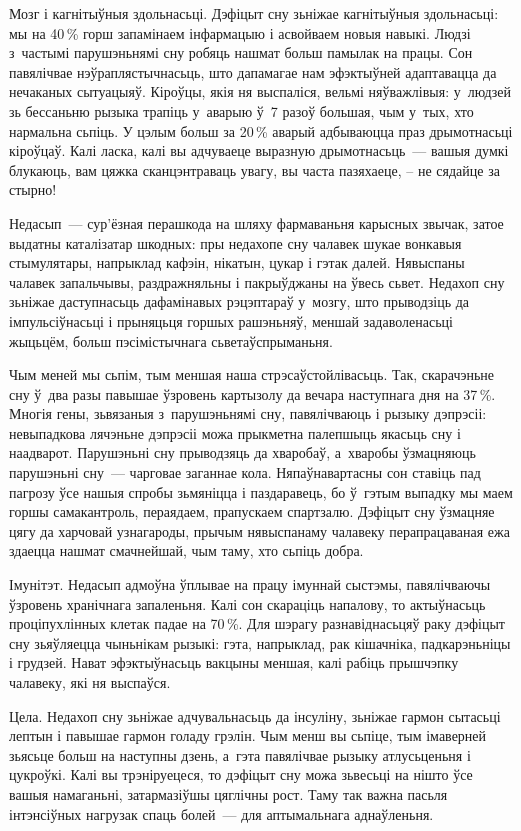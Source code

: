 Мозг і кагнітыўныя здольнасьці. Дэфіцыт сну зьніжае кагнітыўныя здольнасьці: мы на 40\,\% горш запамінаем інфармацыю і асвойваем новыя навыкі. Людзі з~частымі парушэньнямі сну робяць нашмат больш памылак на працы. Сон павялічвае нэўраплястычнасьць, што дапамагае нам эфэктыўней адаптавацца да нечаканых сытуацыяў. Кіроўцы, якія ня выспаліся, вельмі няўважлівыя: у~людзей зь бессаньню рызыка трапіць у~аварыю ў~7 разоў большая, чым у~тых, хто нармальна сьпіць. У цэлым больш за 20\,\% аварый адбываюцца праз дрымотнасьці кіроўцаў. Калі ласка, калі вы адчуваеце выразную дрымотнасьць~--- вашыя думкі блукаюць, вам цяжка сканцэнтраваць увагу, вы часта пазяхаеце, -- не сядайце за стырно!

Недасып~--- сур'ёзная перашкода на шляху фармаваньня карысных звычак, затое выдатны каталізатар шкодных: пры недахопе сну чалавек шукае вонкавыя стымулятары, напрыклад кафэін, нікатын, цукар і гэтак далей. Нявыспаны чалавек запальчывы, раздражняльны і пакрыўджаны на ўвесь сьвет. Недахоп сну зьніжае даступнасьць дафамінавых рэцэптараў у~мозгу, што прыводзіць да імпульсіўнасьці і прыняцьця горшых рашэньняў, меншай задаволенасьці жыцьцём, больш пэсімістычнага сьветаўспрыманьня.

Чым меней мы сьпім, тым меншая наша стрэсаўстойлівасьць. Так, скарачэньне сну ў~два разы павышае ўзровень картызолу да вечара наступнага дня на 37\,\%. Многія гены, зьвязаныя з~парушэньнямі сну, павялічваюць і рызыку дэпрэсіі: невыпадкова лячэньне дэпрэсіі можа прыкметна палепшыць якасьць сну і наадварот. Парушэньні сну прыводзяць да хваробаў, а~хваробы ўзмацняюць парушэньні сну~--- чарговае заганнае кола. Няпаўнавартасны сон ставіць пад пагрозу ўсе нашыя спробы зьмяніцца і паздаравець, бо ў~гэтым выпадку мы маем горшы самакантроль, пераядаем, прапускаем спартзалю. Дэфіцыт сну ўзмацняе цягу да харчовай узнагароды, прычым нявыспанаму чалавеку перапрацаваная ежа здаецца нашмат смачнейшай, чым таму, хто сьпіць добра.

Імунітэт. Недасып адмоўна ўплывае на працу імуннай сыстэмы, павялічваючы ўзровень хранічнага запаленьня. Калі сон скараціць напалову, то актыўнасьць проціпухлінных клетак падае на 70\,\%. Для шэрагу разнавіднасьцяў раку дэфіцыт сну зьяўляецца чыньнікам рызыкі: гэта, напрыклад, рак кішачніка, падкарэньніцы і грудзей. Нават эфэктыўнасьць вакцыны меншая, калі рабіць прышчэпку чалавеку, які ня выспаўся.

Цела. Недахоп сну зьніжае адчувальнасьць да інсуліну, зьніжае гармон сытасьці лептын і павышае гармон голаду грэлін. Чым менш вы сьпіце, тым імаверней зьясьце больш на наступны дзень, а~гэта павялічвае рызыку атлусьценьня і цукроўкі. Калі вы трэніруецеся, то дэфіцыт сну можа зьвесьці на нішто ўсе вашыя намаганьні, затармазіўшы цяглічны рост. Таму так важна пасьля інтэнсіўных нагрузак спаць болей~--- для аптымальнага аднаўленьня.

